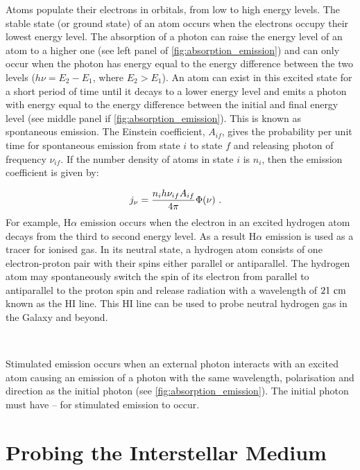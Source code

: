 Atoms populate their electrons in orbitals, from low to high energy levels. The stable state (or ground state) of an atom occurs when the electrons occupy their lowest energy level. The absorption of a photon can raise the energy level of an atom to a higher one (see left panel of \autoref{fig:absorption_emission}) and can only occur when the photon has energy equal to the energy difference between the two levels ($h\nu=E_2-E_1$, where $E_2>E_1$). An atom can exist in this excited state for a short period of time until it decays to a lower energy level and emits a photon with energy equal to the energy difference between the initial and final energy level (see middle panel if \autoref{fig:absorption_emission}). This is known as spontaneous emission. The Einstein coefficient, $A_{if}$, gives the probability per unit time for spontaneous emission from state $i$ to state $f$ and releasing photon of frequency $\nu_{if}$. If the number density of atoms in state $i$ is $n_i$, then the emission coefficient is given by:

\begin{equation}
	\begin{aligned}
		j_\nu&=\frac{n_ih\nu_{if}A_{if}}{4\pi}\Phi\qty(\nu)\text{ .}
	\end{aligned} \label{eq:interstellar_medium_emission_coefficient}
\end{equation}
\noindent For example, H$\alpha$ emission occurs when the electron in an excited hydrogen atom decays from the third to second energy level. As a result H$\alpha$ emission is used as a tracer for ionised gas. In its neutral state, a hydrogen atom consists of one electron-proton pair with their spins either parallel or antiparallel. The hydrogen atom may spontaneously switch the spin of its electron from parallel to antiparallel to the proton spin and release radiation with a wavelength of $21~\si{\centi\meter}$ known as the HI line. This HI line can be used to probe neutral hydrogen gas in the Galaxy and beyond.
\par~\par
Stimulated emission occurs when an external photon interacts with an excited atom causing an emission of a photon with the same wavelength, polarisation and direction as the initial photon (see \autoref{fig:absorption_emission}). The initial photon must have -- for stimulated emission to occur.

\section{Probing the Interstellar Medium} 

